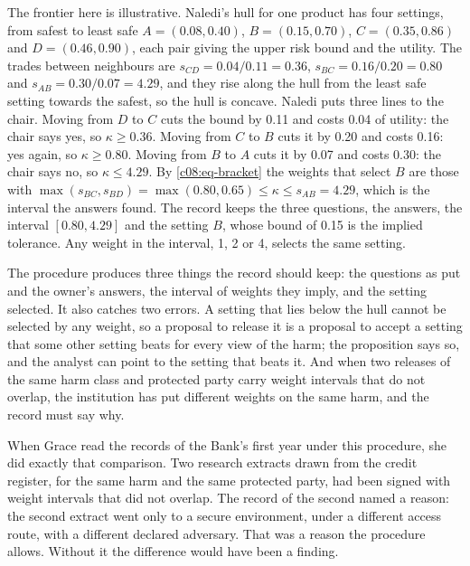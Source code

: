 \begin{example}\label{c08:ex-chair}
The frontier here is illustrative. Naledi's hull for one product has four settings, from
safest to least safe $A = (0.08, 0.40)$, $B = (0.15, 0.70)$, $C = (0.35, 0.86)$ and
$D = (0.46, 0.90)$, each pair giving the upper risk bound and the utility. The trades
between neighbours are $s_{CD} = 0.04/0.11 = 0.36$, $s_{BC} = 0.16/0.20 = 0.80$ and
$s_{AB} = 0.30/0.07 = 4.29$, and they rise along the hull from the least safe setting
towards the safest, so the hull is concave. Naledi puts three lines to the chair. Moving
from $D$ to $C$ cuts the bound by 0.11 and costs 0.04 of utility: the chair says yes, so
$\kappa \ge 0.36$. Moving from $C$ to $B$ cuts it by 0.20 and costs 0.16: yes again, so
$\kappa \ge 0.80$. Moving from $B$ to $A$ cuts it by 0.07 and costs 0.30: the chair says
no, so $\kappa \le 4.29$. By \eqref{c08:eq-bracket} the weights that select $B$ are those
with $\max(s_{BC}, s_{BD}) = \max(0.80, 0.65) \le \kappa \le s_{AB} = 4.29$, which is the
interval the answers found. The record keeps the three questions, the answers, the
interval $[0.80, 4.29]$ and the setting $B$, whose bound of 0.15 is the implied
tolerance. Any weight in the interval, 1, 2 or 4, selects the same setting.
\end{example}

The procedure produces three things the record should keep: the questions as put
and the owner's answers, the interval of weights they imply, and the setting
selected. It also catches two errors. A setting that lies below the hull cannot be
selected by any weight, so a proposal to release it is a proposal to accept a
setting that some other setting beats for every view of the harm; the proposition
says so, and the analyst can point to the setting that beats it. And when two
releases of the same harm class and protected party carry weight intervals that do
not overlap, the institution has put different weights on the same harm, and the
record must say why.

When Grace read the records of the Bank's first year under this procedure, she did
exactly that comparison. Two research extracts drawn from the credit register, for
the same harm and the same protected party, had been signed with weight intervals
that did not overlap. The record of the second named a reason: the second extract
went only to a secure environment, under a different access route, with a different
declared adversary. That was a reason the procedure allows. Without it the
difference would have been a finding.

